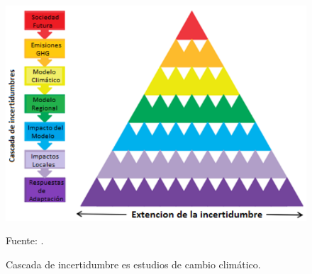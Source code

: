 \begin{figure}[t]
	\includegraphics[width=13cm]{Images/tpbu.png}
	\centering
	\caption{Cascada de incertidumbre es estudios de cambio climático.}
	Fuente: \citet{Wilby2010}.
	\label{fig:tpbu}
\end{figure}